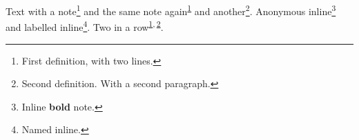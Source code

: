 Text with a note\footnote{First definition,
with two lines.\label{org7bfd295}} and the same note again\textsuperscript{\ref{org7bfd295}} and another\footnote{Second definition.
With a second paragraph.\label{orgaf3ed89}}.
Anonymous inline\footnote{Inline \textbf{bold} note.} and labelled inline\footnote{Named inline.}.
Two in a row\textsuperscript{\ref{org7bfd295}}\textsuperscript{,}\,\textsuperscript{\ref{orgaf3ed89}}.
